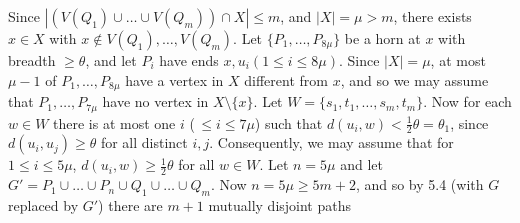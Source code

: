 Since $|(V(Q_1) \cup \dots \cup V(Q_m)) \cap X| \le m$, and $|X| = \mu > m$, there exists $x \in X$ with $x \notin V(Q_1), \dots, V(Q_m)$. Let $\{P_1, \dots, P_{8\mu}\}$ be a horn at $x$ with breadth $\ge \theta$, and let $P_i$ have ends $x, u_i (1 \le i \le 8\mu)$. Since $|X| = \mu$, at most $\mu - 1$ of $P_1, \dots, P_{8\mu}$ have a vertex in $X$ different from $x$, and so we may assume that $P_1, \dots, P_{7\mu}$ have no vertex in $X \setminus \{x\}$. Let $W = \{s_1, t_1, \dots, s_m, t_m\}$. Now for each $w \in W$ there is at most one $i$ (\,$\le i \le 7\mu$) such that $d(u_i, w) < \frac{1}{2}\theta = \theta_1$, since $d(u_i, u_j) \ge \theta$ for all distinct $i, j$. Consequently, we may assume that for $1 \le i \le 5\mu$, $d(u_i, w) \ge \frac{1}{2}\theta$ for all $w \in W$. Let $n = 5\mu$ and let $G' = P_1 \cup \dots \cup P_n \cup Q_1 \cup \dots \cup Q_m$. Now $n = 5\mu \ge 5m + 2$, and so by 5.4 (with $G$ replaced by $G'$) there are $m + 1$ mutually disjoint paths
